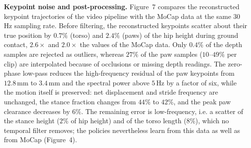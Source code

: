
\textbf{Keypoint noise and post-processing.} Figure~7 compares the reconstructed keypoint trajectories of the video pipeline with the MoCap data at the same $30\,$Hz sampling rate. Before filtering, the reconstructed keypoints scatter about their true position by $0.7\%$ (torso) and $2.4\%$ (paws) of the hip height during ground contact, $2.6\times$ and $2.0\times$ the values of the MoCap data. Only $0.4\%$ of the depth samples are rejected as outliers, whereas $27\%$ of the paw samples ($10$--$49\%$ per clip) are interpolated because of occlusions or missing depth readings. The zero-phase low-pass reduces the high-frequency residual of the paw keypoints from $12.8\,$mm to $3.4\,$mm and the spectral power above $5\,$Hz by a factor of six, while the motion itself is preserved: net displacement and stride frequency are unchanged, the stance fraction changes from $44\%$ to $42\%$, and the peak paw clearance decreases by $6\%$. The remaining error is low-frequency, i.e. a scatter of the stance height ($2\%$ of hip height) and of the torso length ($8\%$), which no temporal filter removes; the policies nevertheless learn from this data as well as from MoCap (Figure~4).
